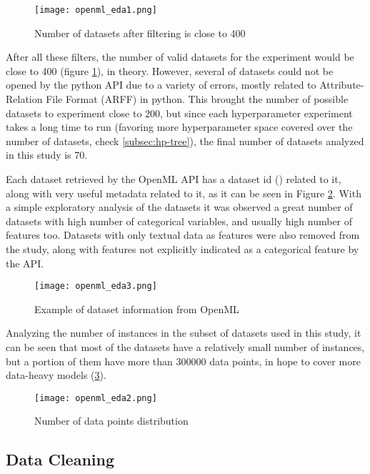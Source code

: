 \begin{figure}[!h]
    \centering
    \texttt{[image: openml\_eda1.png]} 
    \caption{Number of datasets after filtering is close to 400}
    \label{fig:openml-eda1}
\end{figure}

After all these filters, the number of valid datasets for the experiment would be close to 400 (figure \ref{fig:openml-eda1}), in theory. However, several of datasets could not be opened by the python API due to a variety of errors, mostly related to Attribute-Relation File Format (ARFF) in python. This brought the number of possible datasets to experiment close to $200$, but since each hyperparameter experiment takes a long time to run (favoring more hyperparameter space covered over the number of datasets, check \ref{subsec:hp-tree}), the final number of datasets analyzed in this study is 70.


Each dataset retrieved by the OpenML API has a dataset id () related to it, along with very useful metadata related to it, as it can be seen in Figure \ref{fig:openml-eda3}. With a simple exploratory analysis of the datasets it was observed a great number of datasets with high number of categorical variables, and usually high number of features too. Datasets with only textual data as features were also removed from the study, along with features not explicitly indicated as a categorical feature by the API.

\begin{figure}[!h]
    \centering
    \texttt{[image: openml\_eda3.png]} 
    \caption{Example of dataset information from OpenML}
    \label{fig:openml-eda3}
\end{figure}

Analyzing the number of instances in the subset of datasets used in this study, it can be seen that most of the datasets have a relatively small number of instances, but a portion of them have more than $300000$ data points, in hope to cover more data-heavy models (\ref{fig:openml-eda2}).

\begin{figure}[!h]
    \centering
    \texttt{[image: openml\_eda2.png]} 
    \caption{Number of data points distribution}
    \label{fig:openml-eda2}
\end{figure}

\newpage

\subsection{Data Cleaning}

